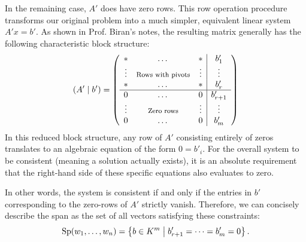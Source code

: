 \begin{answer}
In the remaining case, $A'$ does have zero rows. This row operation procedure transforms our original problem into a much simpler, equivalent linear system $A'x = b'$. As shown in Prof. Biran's notes, the resulting matrix generally has the following characteristic block structure:
\begin{equation}
\label{eq:block_consistency}
(A' \mid b') = \left( 
\begin{array}{ccc|c}
* & \dots & * & b'_{1} \\
\vdots & \text{\footnotesize Rows with pivots} & \vdots & \vdots \\
* & \dots & * & b'_{r} \\ \hline
0 & \dots & 0 & b'_{r+1} \\
\vdots & \text{\footnotesize Zero rows} & \vdots & \vdots \\
0 & \dots & 0 & b'_{m}
\end{array} 
\right)
\end{equation}
In this reduced block structure, any row of $A'$ consisting entirely of zeros translates to an algebraic equation of the form $0 = b'_{i}$. For the overall system to be consistent (meaning a solution actually exists), it is an absolute requirement that the right-hand side of these specific equations also evaluates to zero. 

In other words, the system is consistent if and only if the entries in $b'$ corresponding to the zero-rows of $A'$ strictly vanish. Therefore, we can concisely describe the span as the set of all vectors satisfying these constraints:
\[
\operatorname{Sp}(w_{1}, \dots, w_{n}) = \left\{ b \in K^{m} \;\middle|\; b'_{r+1} = \dots = b'_{m} = 0 \right\}.
\]
\end{answer}

